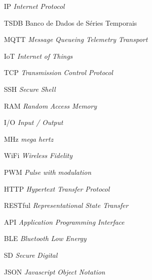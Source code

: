 \documentclass[
	12pt,				%
	oneside,
	a4paper,			%
	english,			%
	brazil				%
	]{abntex2ufop} %
\begin{document}
\listoffigures*
\cleardoublepage

\listoftables*
\cleardoublepage

\renewcommand{\lstlistingname}{Código}
\renewcommand{\lstlistlistingname}{Lista de códigos}
\lstlistoflistings
\cleardoublepage

\begin{siglas}
  \item[IP] \textit{Internet Protocol}
  \item[TSDB] Banco de Dados de Séries Temporais
  \item[MQTT] \textit{Message Queueing Telemetry Transport}
  \item[IoT] \textit{Internet of Things}
  \item[TCP] \textit{Transmission Control Protocol}
  \item[SSH] \textit{Secure Shell}
  \item[RAM] \textit{Random Access Memory}
  \item[I/O] \textit{Input / Output}
  \item[MHz] \textit{mega hertz}
  \item[WiFi] \textit{Wireless Fidelity}
  \item[PWM] \textit{Pulse with modulation}
  \item[HTTP] \textit{Hypertext Transfer Protocol}
  \item[RESTful] \textit{Representational State Transfer}
  \item[API] \textit{Application Programming Interface}
  \item[BLE] \textit{Bluetooth Low Energy}
  \item[SD] \textit{Secure Digital}
  \item[JSON] \textit{Javascript Object Notation}
\end{siglas}

\end{document}
